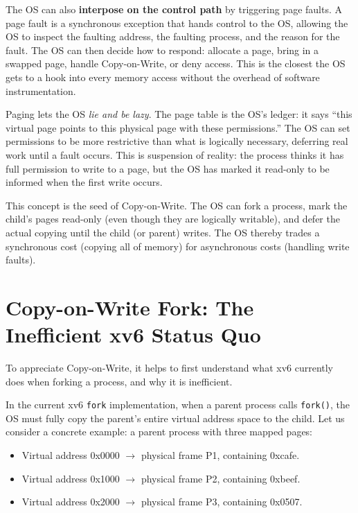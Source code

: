 \documentclass[11pt]{article}
\begin{document}
The OS can also \textbf{interpose on the control path} by triggering page faults. A page fault is a synchronous exception that hands control to the OS, allowing the OS to inspect the faulting address, the faulting process, and the reason for the fault. The OS can then decide how to respond: allocate a page, bring in a swapped page, handle Copy-on-Write, or deny access. This is the closest the OS gets to a hook into every memory access without the overhead of software instrumentation.

\begin{keyintuition}
Paging lets the OS \textit{lie and be lazy}. The page table is the OS's ledger: it says ``this virtual page points to this physical page with these permissions.'' The OS can set permissions to be more restrictive than what is logically necessary, deferring real work until a fault occurs. This is suspension of reality: the process thinks it has full permission to write to a page, but the OS has marked it read-only to be informed when the first write occurs.
\end{keyintuition}

This concept is the seed of Copy-on-Write. The OS can fork a process, mark the child's pages read-only (even though they are logically writable), and defer the actual copying until the child (or parent) writes. The OS thereby trades a synchronous cost (copying all of memory) for asynchronous costs (handling write faults).

\section{Copy-on-Write Fork: The Inefficient xv6 Status Quo}

To appreciate Copy-on-Write, it helps to first understand what xv6 currently does when forking a process, and why it is inefficient.

In the current xv6 \texttt{fork} implementation, when a parent process calls \texttt{fork()}, the OS must fully copy the parent's entire virtual address space to the child. Let us consider a concrete example: a parent process with three mapped pages:

\begin{itemize}
    \item Virtual address 0x0000 $\rightarrow$ physical frame P1, containing 0xcafe.
    \item Virtual address 0x1000 $\rightarrow$ physical frame P2, containing 0xbeef.
    \item Virtual address 0x2000 $\rightarrow$ physical frame P3, containing 0x0507.
\end{itemize}
\end{document}
